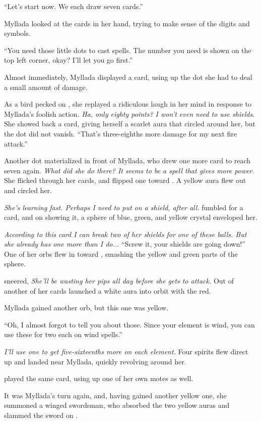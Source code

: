 ``Let's start now. We each draw seven cards.''

Myllada looked at the cards in her hand, trying to make sense of the digits and symbols.

``You need those little dots to cast spells. The number you need is shown on the top left corner, okay? I'll let you go first.''

Almost immediately, Myllada displayed a card, using up the dot she had to deal a small amount of damage.

As a bird pecked on \yronsyncra, she replayed a ridiculous laugh in her mind in response to Myllada's foolish action. \emph{Ha, only eighty points? I won't even need to use shields.} She showed back a card, giving herself a scarlet aura that circled around her, but the dot did not vanish. ``That's three-eighths more damage for my next fire attack.''

Another dot materialized in front of Myllada, who drew one more card to reach seven again. \emph{What did she do there? It seems to be a spell that gives more power.} She flicked through her cards, and flipped one toward \yronsyncra. A yellow aura flew out and circled her.

\emph{She's learning fast. Perhaps I need to put on a shield, after all.} \yronsyncra{} fumbled for a card, and on showing it, a sphere of blue, green, and yellow crystal enveloped her.

\emph{According to this card I can break two of her shields for one of these balls. But she already has one more than I do...} ``Screw it, your shields are going down!'' One of her orbs flew in toward \yronsyncra, smashing the yellow and green parts of the sphere.

\yronsyncra{} sneered, \emph{She'll be wasting her pips all day before she gets to attack.} Out of another of her cards launched a white aura into orbit with the red.

Myllada gained another orb, but this one was yellow.

``Oh, I almost forgot to tell you about those. Since your element is wind, you can use these for two each on wind spells.''

\emph{I'll use one to get five-sixteenths more on each element.} Four spirits flew direct up and landed near Myllada, quickly revolving around her.

\yronsyncra{} played the same card, using up one of her own motes as well.

It was Myllada's turn again, and, having gained another yellow one, she summoned a winged swordsman, who absorbed the two yellow auras and slammed the sword on \yronsyncra.

